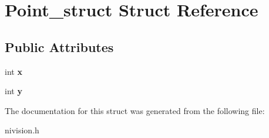 \hypertarget{structPoint__struct}{\section{\-Point\-\_\-struct \-Struct \-Reference}
\label{structPoint__struct}
}
\subsection*{\-Public \-Attributes}
\begin{DoxyCompactItemize}
\item 
\hypertarget{structPoint__struct_afb37aa2c67f0991515ba7c6d99a109b6}{int {\bfseries x}}\label{structPoint__struct_afb37aa2c67f0991515ba7c6d99a109b6}

\item 
\hypertarget{structPoint__struct_a7a3666129a9e4b4e2559063c06073fd3}{int {\bfseries y}}\label{structPoint__struct_a7a3666129a9e4b4e2559063c06073fd3}

\end{DoxyCompactItemize}


\-The documentation for this struct was generated from the following file\-:\begin{DoxyCompactItemize}
\item 
nivision.\-h\end{DoxyCompactItemize}
